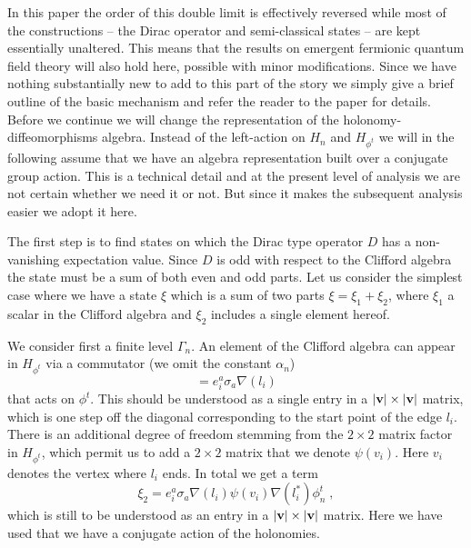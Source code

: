 \documentclass[12pt]{article}
\newcommand{\nn}{\nonumber}
\def\a{\alpha}
\def\G{\Gamma}
\begin{document}
In this paper the order of this double limit is effectively reversed while most of the constructions -- the Dirac operator and semi-classical states -- are kept essentially unaltered. This means that the results on emergent fermionic quantum field theory will also hold here, possible with minor modifications. 
Since we have nothing substantially new to add to this part of the story we simply give a brief outline of the basic mechanism and refer the reader to the paper \cite{Aastrup:2011dt} for details.\\


Before we continue we will change the representation of the holonomy-diffeomorphisms algebra. Instead of the left-action on $H_n$ and $H_{\phi^t}$ we will in the following assume that we have an algebra representation built over a conjugate group action. This is a technical detail and at the present level of analysis we are not certain whether we need it or not. But since it makes the subsequent analysis easier we adopt it here.


The first step is to find states on which the Dirac type operator $D$ has a non-vanishing expectation value. Since $D$ is odd with respect to the Clifford algebra the state must be a sum of both even and odd parts. Let us consider the simplest case where we have a state $\xi$ which is a sum of two parts $\xi= \xi_1 + \xi_2$, where $\xi_1$ a scalar in the Clifford algebra and $\xi_2$ includes a single element hereof. 


We consider first a finite level $\G_n$. An element of the Clifford algebra can appear in $H_{\phi^t}$ via a commutator (we omit the constant $\a_n$)
\begin{equation}
[D,\nabla(l_i)] = e_i^a \sigma_a \nabla(l_i)  
\nn
\end{equation}
that acts on $\phi^t$. This should be understood as a single entry in a $\vert {\bf v} \vert \times \vert {\bf v} \vert$ matrix, which is one step off the diagonal corresponding to the start point of the edge $l_i$.  There is an additional degree of freedom stemming from the $2\times 2$ matrix factor in $H_{\phi^t}$, which permit us to add a $2\times 2$ matrix that we denote $\psi(v_i)$. Here $v_i$ denotes the vertex where $l_i$ ends. In total we get a term
$$
\xi_2=e_i^a \sigma_a \nabla(l_i) \psi(v_i)  \nabla(l_i^*)  \phi^t_n  \;,
$$
which is still to be understood as an entry in a $\vert {\bf v} \vert \times \vert {\bf v} \vert$ matrix. Here we have used that we have a conjugate action of the holonomies.
\end{document}
